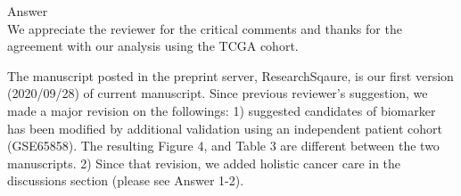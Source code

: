 \documentclass[preprint,12pt]{elsarticle}
\newenvironment{MyColorPar}[1]{%
    \leavevmode\color{#1}\ignorespaces%
}{%
}%
\begin{document}



\begin{MyColorPar}{blue}
Answer\\
We appreciate the reviewer for the critical comments and thanks for the agreement with our analysis using the TCGA cohort.

The manuscript posted in the preprint server, ResearchSqaure, is our first version (2020/09/28) of current manuscript. 
Since previous reviewer's suggestion, we made a major revision on the followings:
1) suggested candidates of biomarker has been modified  by additional validation using an independent patient cohort (GSE65858).
The resulting Figure 4, and Table 3 are different between the two manuscripts.
2) Since that revision, we added holistic cancer care in the discussions section (please see Answer 1-2).%





\end{MyColorPar}

\end{document}
